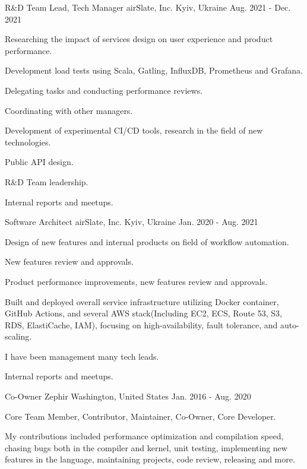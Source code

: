 
\begin{cventries}

  \cventry
    {R\&D Team Lead, Tech Manager}
    {airSlate, Inc.}
    {Kyiv, Ukraine}
    {Aug. 2021 - Dec. 2021}
    {
      \begin{cvitems}
        \item {Researching the impact of services design on user experience and product performance.}
        \item {Development load tests using Scala, Gatling, InfluxDB, Prometheus and Grafana.}
        \item {Delegating tasks and conducting performance reviews.}
        \item {Coordinating with other managers.}
        \item {Development of experimental CI/CD tools, research in the field of new technologies.}
        \item {Public API design.}
        \item {R\&D Team leadership.}
        \item {Internal reports and meetups.}
      \end{cvitems}
    }

  \cventry
    {Software Architect}
    {airSlate, Inc.}
    {Kyiv, Ukraine}
    {Jan. 2020 - Aug. 2021}
    {
      \begin{cvitems}
        \item {Design of new features and internal products on field of workflow automation.}
        \item {New features review and approvals.}
        \item {Product performance improvements, new features review and approvals.}
        \item {Built and deployed overall service infrastructure utilizing Docker container, GitHub Actions, and several AWS stack(Including EC2, ECS, Route 53, S3, RDS, ElastiCache, IAM), focusing on high-availability, fault tolerance, and auto-scaling.}
        \item {I have been management many tech leads.}
        \item {Internal reports and meetups.}
      \end{cvitems}
    }

  \cventry
    {Co-Owner}
    {Zephir}
    {Washington, United States}
    {Jan. 2016 - Aug. 2020}
    {
      \begin{cvitems}
        \item {Core Team Member, Contributor, Maintainer, Co-Owner, Core Developer.}
        \item {My contributions included performance optimization and compilation speed, chasing bugs both in the compiler and kernel, unit testing, implementing new features in the language, maintaining projects, code review, releasing  and more.}
      \end{cvitems}
    }


\end{cventries}
